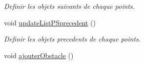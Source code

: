 \begin{DoxyCompactItemize}
\begin{DoxyCompactList}\small\item\em Definir les objets suivants de chaque points. \item\end{DoxyCompactList}\item 
\hypertarget{classLigne_a58643181ea386f7cc5dd9fa2cd0f00eb}{
void \hyperlink{classLigne_a58643181ea386f7cc5dd9fa2cd0f00eb}{updateListPSprecedent} ()}
\label{classLigne_a58643181ea386f7cc5dd9fa2cd0f00eb}

\begin{DoxyCompactList}\small\item\em Definir les objets precedents de chaque points. \item\end{DoxyCompactList}\item 
\hypertarget{classLigne_a513425699b8fe187f87626923c32c96a}{
void \hyperlink{classLigne_a513425699b8fe187f87626923c32c96a}{ajouterObstacle} ()}
\label{classLigne_a513425699b8fe187f87626923c32c96a}


\end{DoxyCompactItemize}
